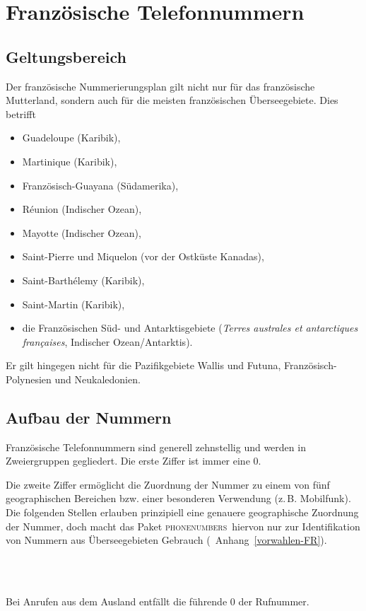 \documentclass[numbers=noenddot]{scrreprt}
\newcommand*{\Paket}[1]{\textsc{#1}}
\newcommand{\phone}{\textcolor{cnltx}{\Paket{phone\-numbers}}}
\newcommand{\UeberschriftGeltungsbereich}{\section{Geltungsbereich}}
\newcommand{\UeberschriftAufbau}{\section{Aufbau der Nummern}}
\newcommand*{\vglAnhang}[1]{(\cf\ Anhang~\ref{#1})}
\begin{document}
\chapter{Französische Telefonnummern}
\UeberschriftGeltungsbereich \label{FR-bereich}
Der französische Nummerierungsplan
\cite{ARCEP}
gilt nicht nur für das französische Mutterland, sondern auch für die meisten französischen Überseegebiete. Dies betrifft
\begin{itemize}
\item Guadeloupe (Karibik),
\item Martinique (Karibik),
\item Französisch-Guayana (Südamerika),
\item R\'eunion (Indischer Ozean),
\item Mayotte (Indischer Ozean),
\item Saint-Pierre und Miquelon (vor der Ostküste Kanadas),
\item Saint-Barth\'elemy (Karibik),
\item Saint-Martin (Karibik),
\item die Französischen Süd- und Antarktisgebiete (\emph{\foreignlanguage{french}{Terres australes et antarctiques françaises}}, Indischer Ozean/Antarktis).
\end{itemize}
Er gilt hingegen nicht für die Pazifikgebiete Wallis und Futuna, Französisch-Polynesien und Neukaledonien.

\UeberschriftAufbau
Französische Telefonnummern sind generell zehnstellig und werden in Zweiergruppen gegliedert. Die erste Ziffer ist immer eine 0.
\begin{sidebyside}
\end{sidebyside}
Die zweite Ziffer ermöglicht die Zuordnung der Nummer zu einem von fünf geographischen Bereichen bzw. einer besonderen Verwendung (z.\,B. Mobilfunk). Die folgenden Stellen erlauben prinzipiell eine genauere geographische Zuordnung der Nummer, doch macht das Paket \phone\ hiervon nur zur Identifikation von Nummern aus Überseegebieten Gebrauch
\vglAnhang{vorwahlen-FR}.
\begin{sidebyside}
   \\
   \\
\end{sidebyside}

Bei Anrufen aus dem Ausland entfällt die führende 0 der Rufnummer.
\begin{sidebyside}
\end{sidebyside}
\end{document}
